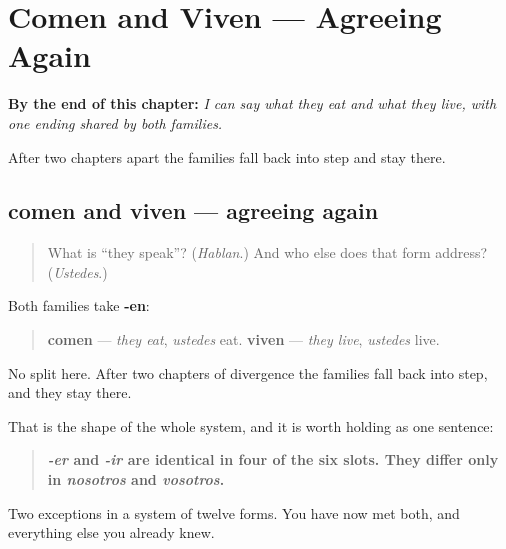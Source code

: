 
\chapter{Comen and Viven --- Agreeing Again}
\label{ch:spanish-er-ir-3pl}

\begin{chapteropening}
\textbf{By the end of this chapter:} \emph{I can say what they eat and what they live, with one ending shared by both families.}

After two chapters apart the families fall back into step and stay there.
\end{chapteropening}

\section[comen · viven]{comen and viven — agreeing again}

\label{lesson:ES-C07-comen-viven}



\begin{quote}
What is \textquotedblleft{}they speak\textquotedblright{}? (\emph{Hablan}.) And who else does that form address? (\emph{Ustedes}.)
\end{quote}

\begin{grammarlens}[title={Grammar Lens: one ending for both}]
Both families take \textbf{-en}:

\begin{quote}
\textbf{comen} — \emph{they eat}, \emph{ustedes} eat. \textbf{viven} — \emph{they live}, \emph{ustedes} live.
\end{quote}

No split here. After two chapters of divergence the families fall back into step, and they stay there.

That is the shape of the whole system, and it is worth holding as one sentence:

\begin{quote}
\textbf{\emph{-er} and \emph{-ir} are identical in four of the six slots. They differ only in \emph{nosotros} and \emph{vosotros}.}
\end{quote}

Two exceptions in a system of twelve forms. You have now met both, and everything else you already knew.
\end{grammarlens}

